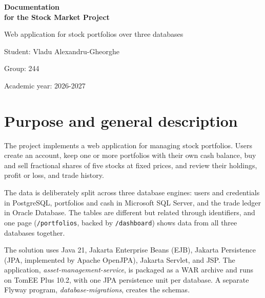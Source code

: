 \documentclass[12pt,a4paper]{article}
\newcommand{\code}[1]{\texttt{\small #1}}
\begin{document}
\begin{titlepage}
\centering
\vspace*{\fill}

{\LARGE\bfseries Documentation\\[0.3cm]
for the Stock Market Project\par}

\vspace{0.7cm}
{\large Web application for stock portfolios over three databases\par}

\vspace{1.5cm}
{\large Student: Vladu Alexandru-Gheorghe\par}
\vspace{0.4cm}
{\large Group: 244\par}

\vspace{1cm}
{\large Academic year: 2026-2027\par}

\vspace*{\fill}
\end{titlepage}

\tableofcontents
\newpage

\section{Purpose and general description}

The project implements a web application for managing stock portfolios.
Users create an account, keep one or more portfolios with their own cash
balance, buy and sell fractional shares of five stocks at fixed prices, and
review their holdings, profit or loss, and trade history.

The data is deliberately split across three database engines: users and
credentials in PostgreSQL, portfolios and cash in Microsoft SQL Server, and
the trade ledger in Oracle Database. The tables are different but related
through identifiers, and one page (\code{/portfolios}, backed by
\code{/dashboard}) shows data from all three databases together.

The solution uses Java 21, Jakarta Enterprise Beans (EJB), Jakarta
Persistence (JPA, implemented by Apache OpenJPA), Jakarta Servlet, and JSP.
The application, \emph{asset-management-service}, is packaged as a WAR
archive and runs on TomEE Plus 10.2, with one JPA persistence unit per
database. A separate Flyway program, \emph{database-migrations}, creates the
schemas.
\end{document}
